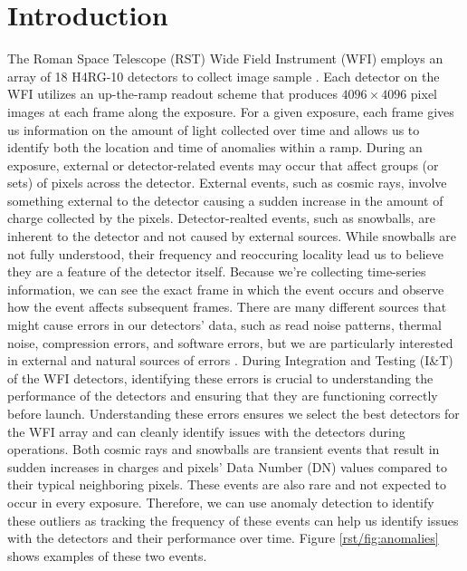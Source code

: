 \section{Introduction}
The Roman Space Telescope (RST) Wide Field Instrument (WFI) employs an array of 18 H4RG-10 detectors to collect image sample \parencite{Mosby_2020}.
Each detector on the WFI utilizes an up-the-ramp readout scheme that produces $4096 \times 4096$ pixel images at each frame along the exposure. 
For a given exposure, each frame gives us information on the amount of light collected over time and allows us to identify both the location and time of anomalies within a ramp.
During an exposure, external or detector-related events may occur that affect groups (or sets) of pixels across the detector. 
External events, such as cosmic rays, involve something external to the detector causing a sudden increase in the amount of charge collected by the pixels.
Detector-realted events, such as snowballs, are inherent to the detector and not caused by external sources.
While snowballs are not fully understood, their frequency and reoccuring locality lead us to believe they are a feature of the detector itself.
Because we're collecting time-series information, we can see the exact frame in which the event occurs and observe how the event affects subsequent frames. 
There are many different sources that might cause errors in our detectors' data, such as read noise patterns, thermal noise, compression errors, and software errors, but we are particularly interested in external and natural sources of errors \parencite{cillis2018snowballs}. 
During Integration and Testing (I\&T) of the WFI detectors, identifying these errors is crucial to understanding the performance of the detectors and ensuring that they are functioning correctly before launch.
Understanding these errors ensures we select the best detectors for the WFI array and can cleanly identify issues with the detectors during operations.
Both cosmic rays and snowballs are transient events that result in sudden increases in charges and pixels' Data Number (DN) values compared to their typical neighboring pixels.
These events are also rare and not expected to occur in every exposure.
Therefore, we can use anomaly detection to identify these outliers as tracking the frequency of these events can help us identify issues with the detectors and their performance over time.
Figure \ref{rst/fig:anomalies} shows examples of these two events.

